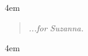{\ssp
{}
\tableofcontents
\newpage
\listoffigures
\listoftables}


\parindent 4em

\begin{acknowledgments}

\end{acknowledgments}


{\ssp
\dedication
\vspace*{50pt}
\begin{quote}
\hfill \textit{...for Suzanna.}
\end{quote}}
\newpage


\startarabicpagination


\parindent 4em
